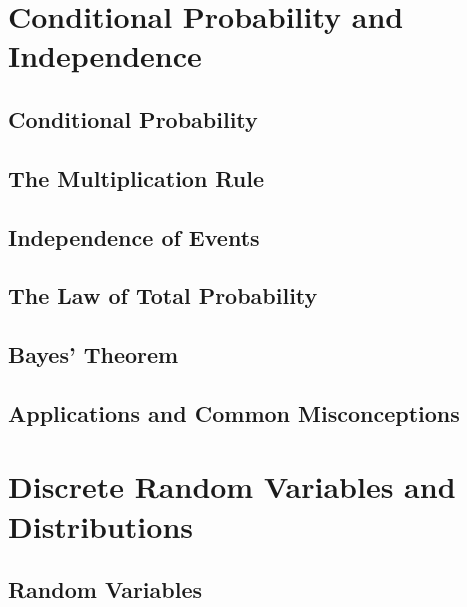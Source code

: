 \documentclass[
  12pt,
]{krantzNoCorner}
\begin{document}
\hypertarget{conditional-probability-and-independence}{%
\chapter{Conditional Probability and Independence}\label{conditional-probability-and-independence}}

\hypertarget{conditional-probability}{%
\section{Conditional Probability}\label{conditional-probability}}

\hypertarget{the-multiplication-rule}{%
\section{The Multiplication Rule}\label{the-multiplication-rule}}

\hypertarget{independence-of-events}{%
\section{Independence of Events}\label{independence-of-events}}

\hypertarget{the-law-of-total-probability}{%
\section{The Law of Total Probability}\label{the-law-of-total-probability}}

\hypertarget{bayes-theorem}{%
\section{Bayes' Theorem}\label{bayes-theorem}}

\hypertarget{applications-and-common-misconceptions}{%
\section{Applications and Common Misconceptions}\label{applications-and-common-misconceptions}}

\hypertarget{discrete-random-variables-and-distributions}{%
\chapter{Discrete Random Variables and Distributions}\label{discrete-random-variables-and-distributions}}

\hypertarget{random-variables}{%
\section{Random Variables}\label{random-variables}}
\end{document}
